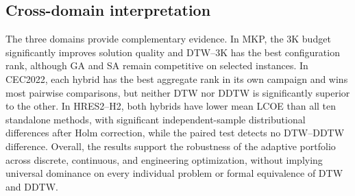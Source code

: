 \subsection{Cross-domain interpretation}
\label{sec:final-stat-synthesis}

The three domains provide complementary evidence. In MKP, the 3K budget
significantly improves solution quality and DTW--3K has the best configuration
rank, although GA and SA remain competitive on selected instances. In
CEC2022, each hybrid has the best aggregate rank in its own campaign and wins
most pairwise comparisons, but neither DTW nor DDTW is significantly superior
to the other. In HRES2--H2, both hybrids have lower mean LCOE than all ten
standalone methods, with significant independent-sample distributional
differences after Holm correction, while the paired test detects no
DTW--DDTW difference.
Overall, the results support the robustness of the adaptive portfolio across
discrete, continuous, and engineering optimization, without implying universal
dominance on every individual problem or formal equivalence of DTW and DDTW.
